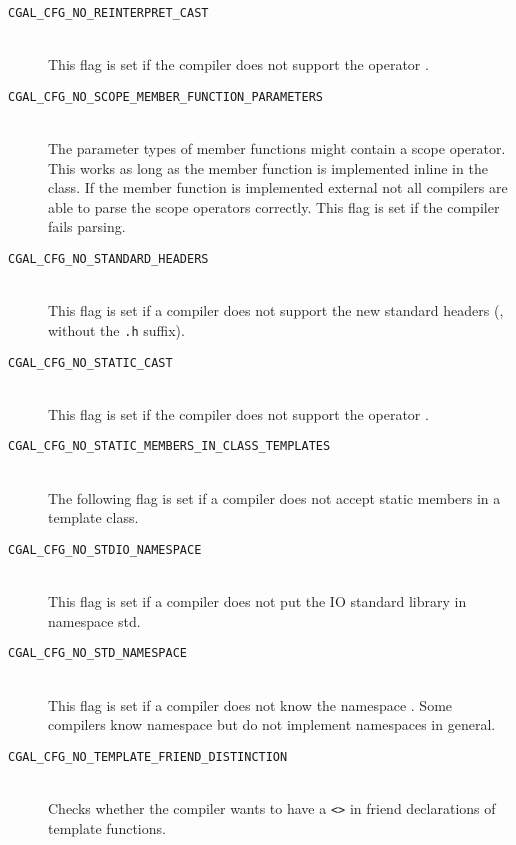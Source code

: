 \begin{description}
\item[{\tt CGAL\_CFG\_NO\_REINTERPRET\_CAST}]~\\
  This flag is set if the compiler does not support the operator
  .

\item[{\tt CGAL\_CFG\_NO\_SCOPE\_MEMBER\_FUNCTION\_PARAMETERS}]~\\
  The parameter types of member functions might contain a scope
  operator. This works as long as the member function is implemented
  inline in the class. If the member function is implemented external
  not all compilers are able to parse the scope operators correctly.
  This flag is set if the compiler fails parsing.
 
\item[{\tt CGAL\_CFG\_NO\_STANDARD\_HEADERS}]~\\ 
  This flag is set if a compiler does not support the new standard
  headers (\ie, without the {\tt .h} suffix).
 
\item[{\tt CGAL\_CFG\_NO\_STATIC\_CAST}]~\\
  This flag is set if the compiler does not support the operator
  .

\item[{\tt CGAL\_CFG\_NO\_STATIC\_MEMBERS\_IN\_CLASS\_TEMPLATES}]~\\
  The following flag is set if a compiler does not accept static
  members in a template class.
 
\item[{\tt CGAL\_CFG\_NO\_STDIO\_NAMESPACE}]~\\ 
  This flag is
  set if a compiler does not put the IO standard library in namespace
  {\ccFont std}.
 
\item[{\tt CGAL\_CFG\_NO\_STD\_NAMESPACE}]~\\ 
  This flag is
  set if a compiler does not know the namespace .  Some
  compilers know namespace  but do not implement namespaces in
  general.

\item[{\tt CGAL\_CFG\_NO\_TEMPLATE\_FRIEND\_DISTINCTION}]~\\ 
  Checks whether the compiler wants to have a \texttt{<>} in friend
  declarations of template functions.


\end{description}
